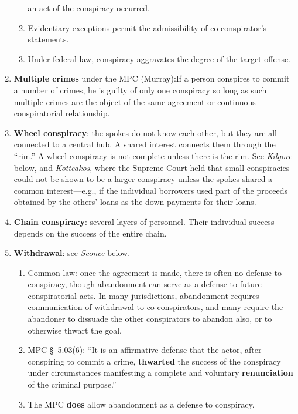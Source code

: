 \begin{enumerate}
\begin{enumerate}
        an act of the conspiracy occurred.
        \item Evidentiary exceptions permit the admissibility of 
        co-conspirator's statements.
        \item Under federal law, conspiracy aggravates the degree of the 
        target offense.
    \end{enumerate}
    \item \textbf{Multiple crimes} under the MPC (Murray):If a person 
    conspires to commit a number of crimes, he is guilty of only one 
    conspiracy so long as such multiple crimes are the object of the same 
    agreement or continuous conspiratorial relationship.
    \item \textbf{Wheel conspiracy}: the spokes do not know each other, but 
    they are all connected to a central hub. A shared interest connects them 
    through the ``rim.'' A wheel conspiracy is not complete unless there is 
    the rim. See \emph{Kilgore} below, and \emph{Kotteakos}, where the Supreme 
    Court held that small conspiracies could not be shown to be a larger 
    conspiracy unless the spokes shared a common interest---e.g., if the 
    individual borrowers used part of the proceeds obtained by the others' 
    loans as the down payments for their loans.
    \item \textbf{Chain conspiracy}: several layers of personnel. Their 
    individual success depends on the success of the entire chain.
    \item \textbf{Withdrawal}: see \emph{Sconce} below.
    \begin{enumerate}
        \item Common law: once the agreement is made, there is often no 
        defense to conspiracy, though abandonment can serve as a defense to 
        future conspiratorial acts. In many jurisdictions, abandonment 
        requires communication of withdrawal to co-conspirators, and many 
        require the abandoner to dissuade the other conspirators to abandon 
        also, or to otherwise thwart the goal.
        \item MPC \S\ 5.03(6): ``It is an affirmative defense that the actor, 
        after conspiring to commit a crime, \textbf{thwarted} the success of 
        the conspiracy under circumstances manifesting a complete and 
        voluntary \textbf{renunciation} of the criminal purpose.''
        \item The MPC \textbf{does} allow abandonment as a defense to 
        conspiracy.
    \end{enumerate}
\end{enumerate}

